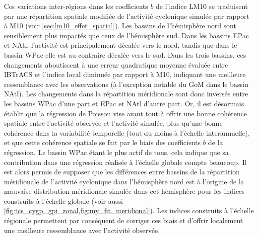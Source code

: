 \documentclass[../main.tex]{subfiles}
\begin{document}
Ces variations inter-régions dans les coefficients $b$ de l'indice LM10 se traduisent par une répartition spatiale modifiée de l'activité cyclonique simulée par
rapport à M10 (voir \cref{sec:lm10_effet_spatial}). Les bassins de l'hémisphère nord sont sensiblement plus impactés que ceux de l'hémisphère sud. Dans les
bassins EPac et NAtl, l'activité est principalement décalée vers le nord, tandis que dans le bassin WPac elle est au contraire décalée vers le sud. Dans les
trois bassins, ces changements aboutissent à une erreur quadratique moyenne évaluée entre IBTrACS et l'indice local diminuée par rapport à M10, indiquant une
meilleure ressemblance avec les observations (à l'exception notable du GoM dans le bassin NAtl). Les changements dans la répartition méridionale sont donc
inversés entre les bassins WPac d'une part et EPac et NAtl d'autre part. Or, il est désormais établit que la régression de Poisson vise avant tout à offrir une
bonne cohérence spatiale entre l'activité observée et l'activité simulée, plus qu'une bonne cohérence dans la variabilité temporelle (tout du moins à l'échelle
interannuelle), et que cette cohérence spatiale se fait par le biais des coefficients $b$ de la régression. Le bassin WPac étant le plus actif de tous, cela
indique que sa contribution dans une régression réalisée à l'échelle globale compte beaucoup. Il est alors permis de supposer que les différences entre bassins
de la répartition méridionale de l'activité cyclonique dans l'hémisphère nord est à l'origine de la mauvaise distribution méridionale simulée dans cet
hémisphère pour les indices construits à l'échelle globale (voir aussi \cref{fig:tcs_cygp_gpi_zonal,fig:my_fit_meridional}). Les indices construits à l'échelle
régionale permettent par conséquent de corriger ces biais et d'offrir localement une meilleure ressemblance avec l'activité observée.

\end{document}
